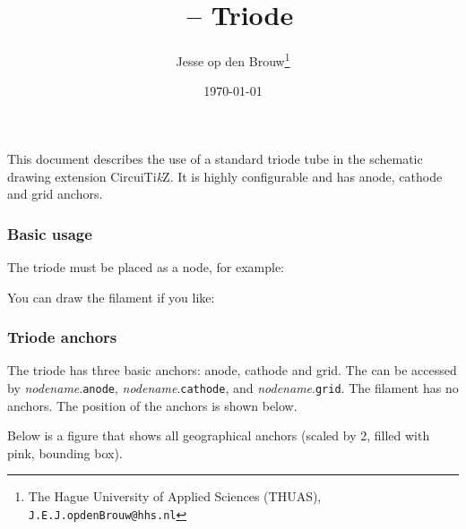 \documentclass[a4paper,titlepage]{article}
\author{Jesse op den Brouw\thanks{The Hague University of Applied Sciences (THUAS), \texttt{J.E.J.opdenBrouw@hhs.nl}}}
\title{\Circuitikz\ -- Triode}
\date{\today}
\def\Circuitikz{CircuiTi\emph{k}Z}
\begin{document}
This document describes the use of a standard triode tube in the schematic drawing extension \Circuitikz. It is highly configurable and has anode, cathode and grid anchors.

\subsubsection*{Basic usage}

The triode must be placed as a node, for example:

\begin{LTXexample}[varwidth]
\end{LTXexample}

You can draw the filament if you like:

\begin{LTXexample}[varwidth]
\end{LTXexample}

\subsubsection*{Triode anchors}

The triode has three basic anchors: anode, cathode and grid. The can be accessed by \emph{nodename}.\texttt{anode}, \emph{nodename}.\texttt{cathode}, and \emph{nodename}.\texttt{grid}. The filament has no anchors. The position of the anchors is shown below.

\begin{LTXexample}[varwidth]
\end{LTXexample}

Below is a figure that shows all geographical anchors (scaled by 2, filled with pink, bounding box).


\end{document}
